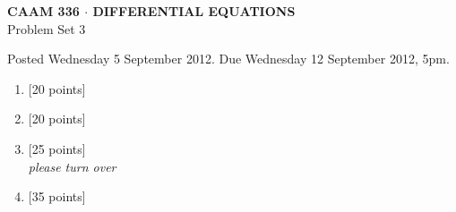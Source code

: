 \documentclass[10pt]{article}
\begin{document}
\begin{center}
\large \textsf{\textbf{CAAM 336 $\cdot$ DIFFERENTIAL EQUATIONS}\\[0.5em]
 Problem Set 3 }
\end{center}

Posted Wednesday 5 September 2012.  Due Wednesday 12 September 2012, 5pm.

\begin{enumerate}
\item {[20 points]}\\  

\vspace*{2em}
\item {[20 points]}\\  

\vspace*{2em}
\item {[25 points]}\\  

\vfill\hfill \emph{please turn over}

\newpage
\item {[35 points]}\\  
\end{enumerate}
\end{document}
